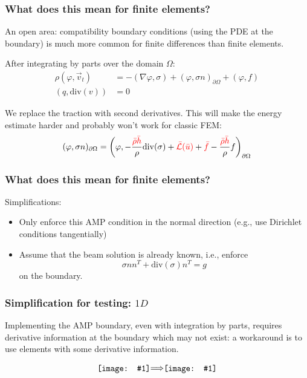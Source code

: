 \documentclass[8pt]{beamer}
\newcommand{\leftd}[1]{{\color{red} \bar{#1}}}
\newcommand{\leftdd}[2]{{\color{red} \bar{#1}(\bar{#2})}}
\newcommand{\divergence}{\mathrm{div}}
\newcommand*{\vcenterimage}[1]{\vcenter{\hbox{\texttt{[image: \#1]}}}}
\newcommand*{\vcenterarrow}{\vcenter{\hbox{$\Longrightarrow$}}}
\begin{document}
\begin{frame}
    \frametitle{What does this mean for finite elements?}
    An open area: compatibility boundary conditions (using the PDE at the
    boundary) is much more common for finite differences than finite elements.

    \pause
    \vspace{0.5in}
    After integrating by parts over the domain \(\Omega\):
    \begin{align}
        \rho (\varphi, \vec{v}_t) &= -(\nabla \varphi, \sigma)
        + (\varphi, \sigma n)_{\partial \Omega}
        + (\varphi, f)                                                        \\
        (q, \divergence(v)) &= 0
    \end{align}

    We replace the traction with second derivatives. This will make the
    energy estimate harder and probably won't work for classic FEM:
    \begin{equation}
        (\varphi, \sigma n)_{\partial \Omega} = \left(\varphi,
        - \dfrac{\leftd{\rho} \leftd{h}}{\rho} \divergence(\sigma)
        + \leftdd{\mathcal{L}}{u}
        + \leftd{f}
        - \dfrac{\leftd{\rho} \leftd{h}}{\rho} f\right)_{\partial \Omega}
    \end{equation}
\end{frame}

\begin{frame}
    \frametitle{What does this mean for finite elements?}
    Simplifications:
    \begin{itemize}
        \item Only enforce this AMP condition in the normal direction (e.g., use
              Dirichlet conditions tangentially)
        \item Assume that the beam solution is already known, i.e., enforce
              \begin{equation}
                  \sigma n n^T + \divergence(\sigma) n^T = g
              \end{equation}
              on the boundary.
    \end{itemize}
\end{frame}

\begin{frame}
    \frametitle{Simplification for testing: \(1D\)}
    Implementing the AMP boundary, even with integration by parts, requires
    derivative information at the boundary which may not exist: a workaround is
    to use elements with some derivative information.

    \begin{figure}
        \begin{equation*}
            \vcenterimage{lagrange-quadratics.png}
            \vcenterarrow
            \vcenterimage{hermite-quadratics.png}
        \end{equation*}
    \end{figure}
\end{frame}
\end{document}
